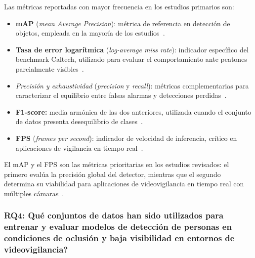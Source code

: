 \documentclass[12pt, a4paper]{article}
\begin{document}
Las m\'{e}tricas reportadas con mayor frecuencia en los estudios
primarios son:
\begin{itemize}
  \item \textbf{mAP} (\textit{mean Average Precision}): m\'{e}trica de
        referencia en detecci\'{o}n de objetos, empleada en la
        mayor\'{i}a de los estudios~\cite{E31, E25, E10}.
  \item \textbf{Tasa de error logar\'{i}tmica} (\textit{log-average
        miss rate}): indicador espec\'{i}fico del benchmark Caltech,
        utilizado para evaluar el comportamiento ante peatones
        parcialmente visibles~\cite{E29, E28}.
  \item \textit{Precisi\'{o}n y exhaustividad} (\textit{precision} y
        \textit{recall}): m\'{e}tricas complementarias para caracterizar
        el equilibrio entre falsas alarmas y detecciones
        perdidas~\cite{E21, E25, E33}.
  \item \textbf{F1-score:} media arm\'{o}nica de las dos anteriores,
        utilizada cuando el conjunto de datos presenta desequilibrio de
        clases~\cite{E24, E23}.
  \item \textbf{FPS} (\textit{frames per second}): indicador de
        velocidad de inferencia, cr\'{i}tico en aplicaciones de
        vigilancia en tiempo real~\cite{E12, E23}.
\end{itemize}

\begin{hallazgo}[]
  El mAP y el FPS son las m\'{e}tricas prioritarias en los estudios
  revisados: el primero eval\'{u}a la precisi\'{o}n global del
  detector, mientras que el segundo determina su viabilidad para
  aplicaciones de videovigilancia en tiempo real con m\'{u}ltiples
  c\'{a}maras~\cite{E21, E12, E23}.
\end{hallazgo}

\subsubsection{RQ4: \textquestiondown Qu\'{e} conjuntos de datos han
sido utilizados para entrenar y evaluar modelos de detecci\'{o}n de
personas en condiciones de oclusi\'{o}n y baja visibilidad en entornos
de videovigilancia?}
\end{document}
